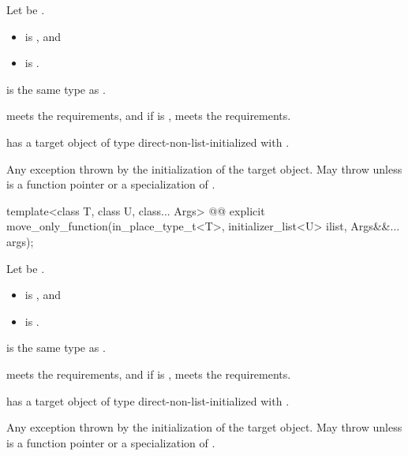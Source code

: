 \begin{itemdescr}
\pnum
Let  be .

\pnum
\constraints
\begin{itemize}
\item {} is , and
\item {} is .
\end{itemize}

\pnum
\mandates
{} is the same type as .

\pnum
\expects
{} meets the  requirements, and if  is ,  meets the  requirements.

\pnum
\ensures
{} has a target object of type  direct-non-list-initialized with .

\pnum
\throws
Any exception thrown by the initialization of the target object. May throw  unless  is a function pointer or a specialization of .
\end{itemdescr}

%
\begin{itemdecl}
template<class T, class U, class... Args>
  @@ explicit move_only_function(in_place_type_t<T>, initializer_list<U> ilist, Args&&... args);
\end{itemdecl}

\begin{itemdescr}
\pnum
Let  be .

\pnum
\constraints
\begin{itemize}
\item {} is , and
\item {} is .
\end{itemize}

\pnum
\mandates
{} is the same type as .

\pnum
\expects
{} meets the  requirements, and if  is ,  meets the  requirements.

\pnum
\ensures
{} has a target object of type  direct-non-list-initialized with .

\pnum
\throws
Any exception thrown by the initialization of the target object. May throw  unless  is a function pointer or a specialization of .
\end{itemdescr}

